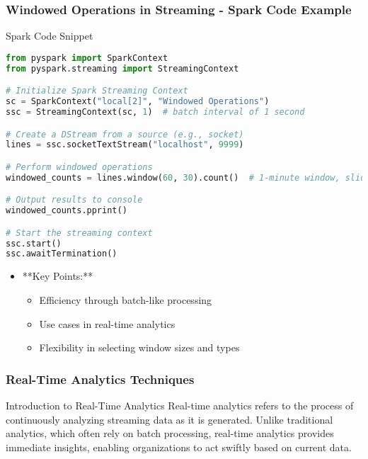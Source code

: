 \documentclass[aspectratio=169]{beamer}
\begin{document}
\begin{frame}[fragile]
    \frametitle{Windowed Operations in Streaming - Spark Code Example}
    \begin{block}{Spark Code Snippet}
        \begin{lstlisting}[language=python]
from pyspark import SparkContext
from pyspark.streaming import StreamingContext

# Initialize Spark Streaming Context
sc = SparkContext("local[2]", "Windowed Operations")
ssc = StreamingContext(sc, 1)  # batch interval of 1 second

# Create a DStream from a source (e.g., socket)
lines = ssc.socketTextStream("localhost", 9999)

# Perform windowed operations
windowed_counts = lines.window(60, 30).count()  # 1-minute window, slide every 30 seconds

# Output results to console
windowed_counts.pprint()

# Start the streaming context
ssc.start()
ssc.awaitTermination()
        \end{lstlisting}
    \end{block}
    
    \begin{itemize}
        \item **Key Points:**
        \begin{itemize}
            \item Efficiency through batch-like processing
            \item Use cases in real-time analytics
            \item Flexibility in selecting window sizes and types
        \end{itemize}
    \end{itemize}
\end{frame}

\begin{frame}[fragile]
    \frametitle{Real-Time Analytics Techniques}
    \begin{block}{Introduction to Real-Time Analytics}
        Real-time analytics refers to the process of continuously analyzing streaming data as it is generated. Unlike traditional analytics, which often rely on batch processing, real-time analytics provides immediate insights, enabling organizations to act swiftly based on current data.
    \end{block}
\end{frame}
\end{document}
